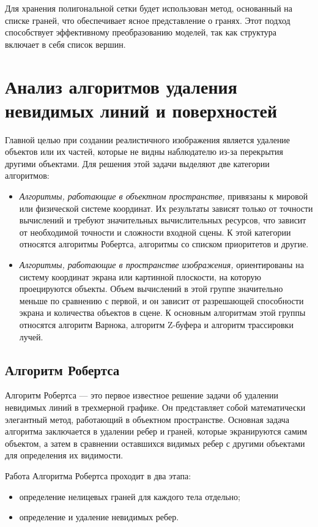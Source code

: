 Для хранения полигональной сетки будет использован метод, основанный на списке граней, что обеспечивает ясное представление о гранях. Этот подход способствует эффективному преобразованию моделей, так как структура включает в себя список вершин.

\section{Анализ алгоритмов удаления невидимых линий и поверхностей}

Главной целью при создании реалистичного изображения является удаление объектов или их частей, которые не видны наблюдателю из-за перекрытия другими объектами. Для решения этой задачи выделяют две категории алгоритмов:

\begin{itemize}[label=--]
	\item \textit{Алгоритмы, работающие в объектном пространстве,} привязаны к мировой или физической системе координат. Их результаты зависят только от точности вычислений и требуют значительных вычислительных ресурсов, что зависит от необходимой точности и сложности входной сцены. К этой категории относятся алгоритмы Робертса, алгоритмы со списком приоритетов и другие.
	
	\item \textit{Алгоритмы, работающие в пространстве изображения,} ориентированы на систему координат экрана или картинной плоскости, на которую проецируются объекты. Объем вычислений в этой группе значительно меньше по сравнению с первой, и он зависит от разрешающей способности экрана и количества объектов в сцене. К основным алгоритмам этой группы относятся алгоритм Варнока, алгоритм Z-буфера и алгоритм трассировки лучей.
\end{itemize}

\subsection{Алгоритм Робертса}

Алгоритм Робертса — это первое известное решение задачи об удалении невидимых линий в трехмерной графике. Он представляет собой математически элегантный метод, работающий в объектном пространстве. Основная задача алгоритма заключается в удалении ребер и граней, которые экранируются самим объектом, а затем в сравнении оставшихся видимых ребер с другими объектами для определения их видимости.

Работа Алгоритма Робертса проходит в два этапа:
\begin{itemize}[label=--]
	\item определение нелицевых граней для каждого тела отдельно;
	\item определение и удаление невидимых ребер.
\end{itemize}

